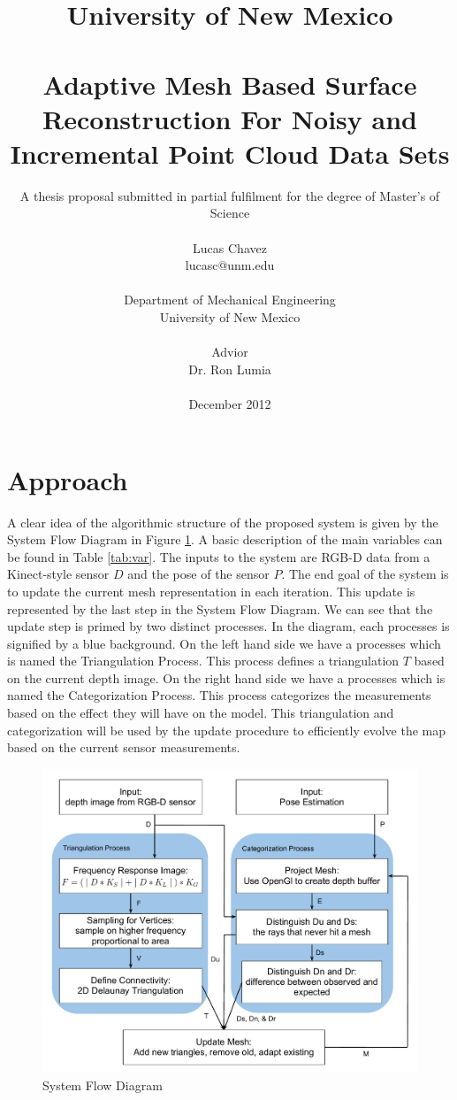 \documentclass[12pt]{article}
\title{{\small University of New Mexico} \\ ~\\ 
Adaptive Mesh Based Surface Reconstruction For Noisy and Incremental Point Cloud Data Sets}
\author{ 
\small A thesis proposal submitted in partial fulfilment for the degree of Master’s of Science \\ ~\\
{Lucas Chavez}  \\
{\small lucasc@unm.edu} \\ ~\\
Department of Mechanical Engineering \\ 
University of New Mexico \\ ~\\
Advior \\ Dr. Ron Lumia \\ ~\\
December 2012
}
\date{}
\begin{document}
\pagestyle{plain}
\maketitle


\section{Approach}
\label{ch:approach}

A clear idea of the algorithmic structure of the proposed system is
given by the System Flow Diagram in Figure \ref{fig:SD}. A basic
description of the main variables can be found in Table \ref{tab:var}.
The inputs to the system are RGB-D data from a Kinect-style sensor $D$
and the pose of the sensor $P$. The end goal of the system is to update
the current mesh representation in each iteration. This update is
represented by the last step in the System Flow Diagram. We can see that
the update step is primed by two distinct processes. In the diagram,
each processes is signified  by a blue background. On the left hand side
we have a processes which is named the Triangulation Process. This
process defines a triangulation $T$ based on the current depth image. On
the right hand side we have a processes which is named the
Categorization Process. This process categorizes the measurements based
on the effect they will have on the model. This triangulation
and categorization will be used by the update procedure to efficiently
evolve the map based on the current sensor measurements.                                                                 

\begin{figure}[h]
  \centering
    \includegraphics[height=0.8\textwidth]{SD.pdf}
  \caption{System Flow Diagram}
  \label{fig:SD}
\end{figure}
\end{document}
